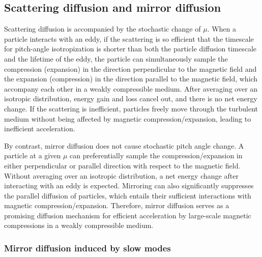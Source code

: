 \documentclass[preprint2,twocolumn,times,tighten]{aastex63}
\begin{document}
\subsection{Scattering diffusion and mirror diffusion}
\label{ssec:scatvsmirror}

Scattering diffusion is accompanied by the stochastic change of $\mu$. 
When a particle interacts with an eddy, 
if the scattering is so efficient that   
the timescale for pitch-angle isotropization is shorter than both the particle diffusion timescale 
and the lifetime of the eddy, 
the particle 
can simultaneously sample the compression (expansion) in the direction perpendicular to the magnetic field 
and the expansion (compression) in the direction parallel to the magnetic field, which accompany each other in a weakly compressible medium. 
After averaging over an isotropic distribution, 
energy gain and loss cancel out, and 
there is no net energy change. 
If the scattering is inefficient, 
particles freely move through the turbulent medium without being affected by magnetic compression/expansion, 
leading to inefficient acceleration. 

By contrast, 
mirror diffusion does not cause stochastic pitch angle change. 
A particle at a given $\mu$ can preferentially sample the compression/expansion in either perpendicular or parallel direction with respect to the magnetic field. 
Without averaging over an isotropic distribution, a net energy change
after interacting with an eddy is expected. 
Mirroring can also significantly suppresses the parallel diffusion of particles, which entails their sufficient interactions with magnetic compression/expansion. 
Therefore, mirror diffusion serves as a promising diffusion mechanism for efficient acceleration by large-scale magnetic compressions in a weakly compressible medium. 








\subsubsection{Mirror diffusion induced by slow modes}
\label{f}
\end{document}
